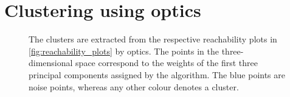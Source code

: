 \section{Clustering using \acs{optics}}\label{sec:evaluation-OPTICS}
\begin{figure}[!htb]%
    \centering
    \qquad
    \caption[\acs*{optics} clusters]{The clusters are extracted from the respective reachability plots in \autoref{fig:reachability_plots} by \ac{optics}.
    The points in the three-dimensional space correspond to the weights of the first three principal components assigned by the \eigendocs{} algorithm.
    The blue points are noise points, whereas any other colour denotes a cluster.}%
    \label{fig:optics_cluster}%
\end{figure}

